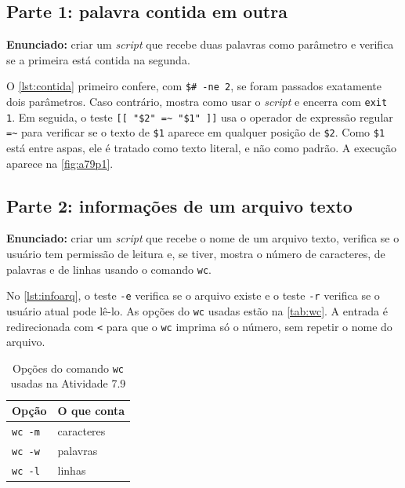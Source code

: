 \subsection{Parte 1: palavra contida em outra}\label{subsec:a79p1}

\textbf{Enunciado:} criar um \textit{script} que recebe duas palavras como parâmetro e verifica
se a primeira está contida na segunda.



O \autoref{lst:contida} primeiro confere, com \texttt{\$\# -ne 2}, se foram passados
exatamente dois parâmetros. Caso contrário, mostra como usar o \textit{script} e encerra com
\texttt{exit 1}. Em seguida, o teste \lstinline[frame=none,numbers=none]{[[ "$2" =~ "$1" ]]} usa o operador
de expressão regular \lstinline[frame=none,numbers=none]{=~} para verificar se o texto de \texttt{\$1} aparece em
qualquer posição de \texttt{\$2}. Como \texttt{\$1} está entre aspas, ele é tratado como texto
literal, e não como padrão. A execução aparece na \autoref{fig:a79p1}.


\subsection{Parte 2: informações de um arquivo texto}\label{subsec:a79p2}

\textbf{Enunciado:} criar um \textit{script} que recebe o nome de um arquivo texto, verifica se o
usuário tem permissão de leitura e, se tiver, mostra o número de caracteres, de palavras e
de linhas usando o comando \texttt{wc}.



No \autoref{lst:infoarq}, o teste \texttt{-e} verifica se o arquivo existe e o teste
\texttt{-r} verifica se o usuário atual pode lê-lo. As opções do \texttt{wc} usadas estão na
\autoref{tab:wc}. A entrada é redirecionada com \texttt{<} para que o \texttt{wc} imprima só o
número, sem repetir o nome do arquivo.

\begin{table}[H]
    \centering
    \caption{Opções do comando \texttt{wc} usadas na Atividade 7.9}
    \label{tab:wc}
    \begin{tabular}{ll}
        \toprule
        \textbf{Opção} & \textbf{O que conta} \\
        \midrule
        \texttt{wc -m} & caracteres \\
        \texttt{wc -w} & palavras \\
        \texttt{wc -l} & linhas \\
        \bottomrule
    \end{tabular}
\end{table}

